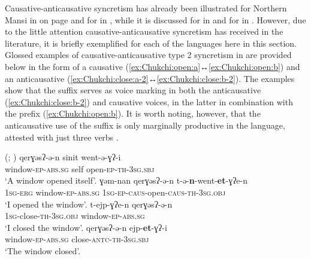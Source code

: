 Causative-anticausative syncretism has already been illustrated for Northern Mansi in  on page \pageref{tab:ch3:type1a-examples-2} and for  in , while it is discussed for  in  and for  in . However, due to the little attention causative-anticausative syncretism has received in the literature, it is briefly exemplified for each of the languages here in this section. Glossed examples of causative-anticausative type 2 syncretism in  are provided below in the form of a causative  (\ref{ex:Chukchi:open:a}↔\ref{ex:Chukchi:open:b}) and an anticausative  (\ref{ex:Chukchi:close:a-2}↔\ref{ex:Chukchi:close:b-2}). The examples show that the suffix  serves as voice marking in both the anticausative (\ref{ex:Chukchi:close:b-2}) and causative voices, in the latter in combination with the prefix  (\ref{ex:Chukchi:open:b}). It is worth noting, however, that the anticausative use of the suffix is only marginally productive in the language, attested with just three verbs \citep[187]{kurebito:2012}.

\largerpage
\ea {} (\citealt[6]{stenin:2017}; \citealt[187]{kurebito:2012})
\ea\label{ex:Chukchi:open:a}
	\gll	qerɣəsʔ-ə-n sinit went-ə-ɣʔ-i \\
			window-\textsc{ep-abs.sg} self open-\textsc{ep-th-3sg.sbj} \\
	\glt	‘A window opened itself’.
\ex\label{ex:Chukchi:open:b}
	\gll	ɣəm-nan qerɣəsʔ-ə-n t-ə-\textbf{n}-went-\textbf{et}-ɣʔe-n \\
			\textsc{1sg-erg} window-\textsc{ep-abs.sg} \textsc{1sg-ep-caus}-open-\textsc{caus-th-3sg.obj} \\
	\glt	‘I opened the window’.
\ex\label{ex:Chukchi:close:a-2}
	\gll	t-ejp-ɣʔe-n qerɣəsʔ-ə-n \\
			\textsc{1sg}-close-\textsc{th-3sg.obj} window-\textsc{ep-abs.sg} \\
	\glt	‘I closed the window’.
\ex\label{ex:Chukchi:close:b-2}
	\gll	qerɣəsʔ-ə-n ejp-\textbf{et}-ɣʔ-i \\
			window-\textsc{ep-abs.sg} close-\textsc{antc-th-3sg.sbj} \\
	\glt	‘The window closed’.
	\z 
\z

